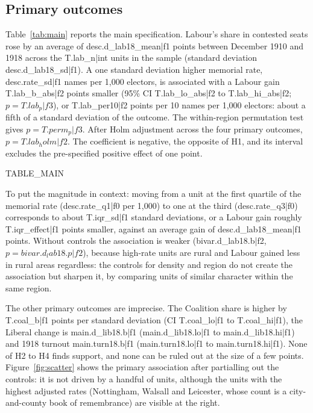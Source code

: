 \documentclass[11pt,a4paper]{article}
\begin{document}
\subsection{Primary outcomes}
Table~\ref{tab:main} reports the main specification. Labour's share in contested seats rose by an average of {{desc.d_lab18_mean|f1}} points between December 1910 and 1918 across the {{T.lab_n|int}} units in the sample (standard deviation {{desc.d_lab18_sd|f1}}). A one standard deviation higher memorial rate, {{desc.rate_sd|f1}} names per 1,000 electors, is associated with a Labour gain {{T.lab_b_abs|f2}} points smaller (95\% CI {{T.lab_lo_abs|f2}} to {{T.lab_hi_abs|f2}}; $p={{T.lab_p|f3}}$), or {{T.lab_per10|f2}} points per 10 names per 1,000 electors: about a fifth of a standard deviation of the outcome. The within-region permutation test gives $p={{T.perm_p|f3}}$. After Holm adjustment across the four primary outcomes, $p={{T.lab_holm|f2}}$. The coefficient is negative, the opposite of H1, and its interval excludes the pre-specified positive effect of one point.

{{TABLE_MAIN}}

To put the magnitude in context: moving from a unit at the first quartile of the memorial rate ({{desc.rate_q1|f0}} per 1,000) to one at the third ({{desc.rate_q3|f0}}) corresponds to about {{T.iqr_sd|f1}} standard deviations, or a Labour gain roughly {{T.iqr_effect|f1}} points smaller, against an average gain of {{desc.d_lab18_mean|f1}} points. Without controls the association is weaker ({{bivar.d_lab18.b|f2}}, $p={{bivar.d_lab18.p|f2}}$), because high-rate units are rural and Labour gained less in rural areas regardless: the controls for density and region do not create the association but sharpen it, by comparing units of similar character within the same region.

The other primary outcomes are imprecise. The Coalition share is higher by {{T.coal_b|f1}} points per standard deviation (CI {{T.coal_lo|f1}} to {{T.coal_hi|f1}}), the Liberal change is {{main.d_lib18.b|f1}} ({{main.d_lib18.lo|f1}} to {{main.d_lib18.hi|f1}}) and 1918 turnout {{main.turn18.b|f1}} ({{main.turn18.lo|f1}} to {{main.turn18.hi|f1}}). None of H2 to H4 finds support, and none can be ruled out at the size of a few points. Figure~\ref{fig:scatter} shows the primary association after partialling out the controls: it is not driven by a handful of units, although the units with the highest adjusted rates (Nottingham, Walsall and Leicester, whose count is a city-and-county book of remembrance) are visible at the right.
\end{document}
